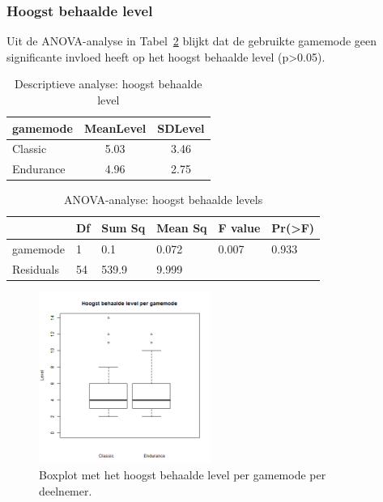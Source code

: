 \documentclass[11pt]{article}
\begin{document}
\subsubsection{Hoogst behaalde level}
Uit de ANOVA-analyse in Tabel~\ref{ANOVA-levels} blijkt dat de gebruikte gamemode geen significante invloed heeft op het hoogst behaalde level (p\textgreater 0.05).
\begin{table}[h]
	\centering
		\begin{tabular}{|lcc|}
        	\hline
			\textbf{gamemode} & \textbf{MeanLevel} & \textbf{SDLevel} \\
            \hline
			Classic & 5.03 & 3.46  \\
			Endurance & 4.96 & 2.75 \\
			\hline
		\end{tabular}
	\caption{Descriptieve analyse: hoogst behaalde level}\label{analyse:levels}
\end{table}

\begin{table}[h]
\centering
\begin{tabular}{|llllll|}
\hline
          & \textbf{Df} & \textbf{Sum Sq}   & \textbf{Mean Sq} & \textbf{F value} & \textbf{Pr(\textgreater F)} \\
\hline
gamemode  & 1  & 0.1      & 0.072   & 0.007   & 0.933             \\
Residuals & 54 & 539.9    & 9.999   &         &                   \\
\hline
\end{tabular}
\caption{ANOVA-analyse: hoogst behaalde levels}
\label{ANOVA-levels}
\end{table}

\begin{figure}[h]
	\centering
	\includegraphics[width=0.5\textwidth]{pictures/Levels.png}
    \caption{Boxplot met het hoogst behaalde level per gamemode per deelnemer.}
    \label{levels:gamemode}
\end{figure}
\end{document}
